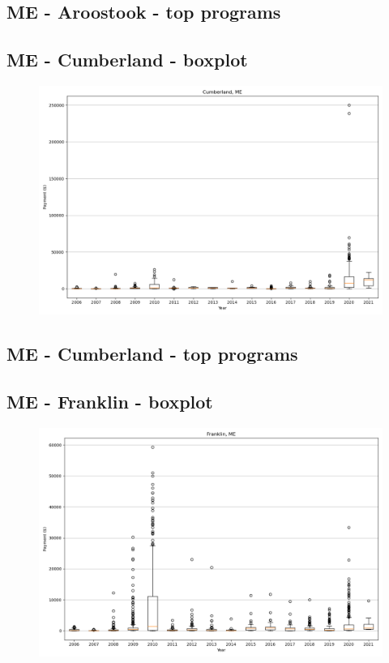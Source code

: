 \subsection*{ME - Aroostook - top programs}

\newpage
\subsection*{ME - Cumberland - boxplot}
\begin{figure}[h]
\centering
\includegraphics[width=7in]{../output/boxplots/counties/Cumberland-ME_boxplot.png}
\end{figure}


\subsection*{ME - Cumberland - top programs}

\newpage
\subsection*{ME - Franklin - boxplot}
\begin{figure}[h]
\centering
\includegraphics[width=7in]{../output/boxplots/counties/Franklin-ME_boxplot.png}
\end{figure}


